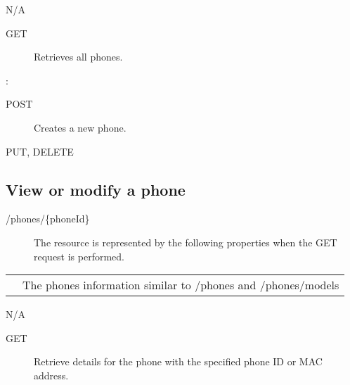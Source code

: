 \documentclass[letterpaper,10pt,english]{sphinxmanual}
\begin{document}
 N/A
\begin{description}
\item[{ GET}] \leavevmode
Retrieves all phones.

\end{description}

:

\begin{sphinxVerbatim}[commandchars=\\\{\}]
\end{sphinxVerbatim}
\begin{description}
\item[{ POST}] \leavevmode
Creates a new phone.

\end{description}

 PUT, DELETE


\subsection{View or modify a phone}
\label{\detokenize{restapi:view-or-modify-a-phone}}
 /phones/\{phoneId\}
\begin{description}
\item[{}] \leavevmode
The resource is represented by the following properties when the GET request is performed.

\end{description}


\begin{savenotes}\sphinxattablestart
\centering
\begin{tabulary}{\linewidth}[t]{|T|T|}
\hline

&
\\
\hline
{}
&
The phones information similar to /phones and /phones/models
\\
\hline
\end{tabulary}
\par
\sphinxattableend\end{savenotes}

 N/A
\begin{description}
\item[{ GET}] \leavevmode
Retrieve details for the phone with the specified phone ID or MAC address.

\end{description}
\end{document}
